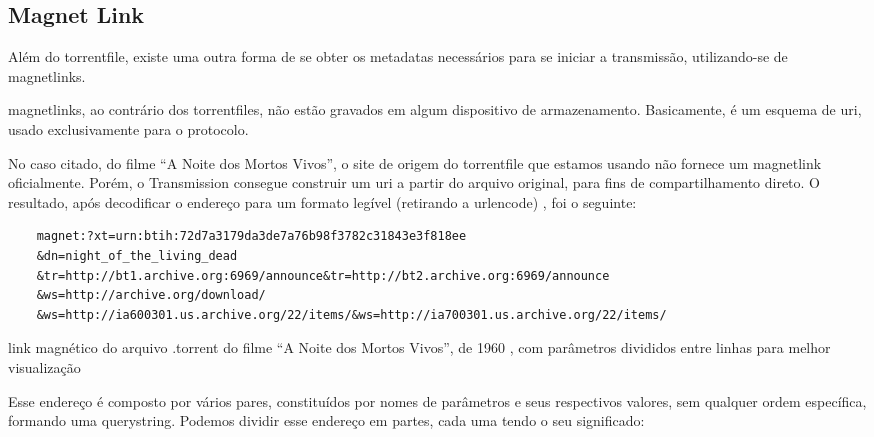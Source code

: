 
\subsection*{Magnet Link}

Além do \gls*{torrentfile}, existe uma outra forma de se obter os \glspl*{metadata}
necessários para se iniciar a transmissão, utilizando-se de \glspl{magnetlink}.

\Glspl*{magnetlink}, ao contrário dos \glspl*{torrentfile}, não estão gravados em
algum dispositivo de armazenamento. Basicamente, é um esquema de \gls{uri}, usado
exclusivamente para o protocolo.

No caso citado, do filme \enquote{A Noite dos Mortos Vivos}, o site de origem do
\gls*{torrentfile} que estamos usando não fornece um \gls*{magnetlink} oficialmente.
Porém, o Transmission consegue construir um \gls*{uri} a partir do arquivo original,
para fins de compartilhamento direto. O resultado, após decodificar o endereço para um
formato legível (retirando a \gls{urlencode}) \cite{wiki:urlencode}, foi o seguinte:

\begin{listing}[ht!]
    \begin{verbatim}
    magnet:?xt=urn:btih:72d7a3179da3de7a76b98f3782c31843e3f818ee
    &dn=night_of_the_living_dead
    &tr=http://bt1.archive.org:6969/announce&tr=http://bt2.archive.org:6969/announce
    &ws=http://archive.org/download/
    &ws=http://ia600301.us.archive.org/22/items/&ws=http://ia700301.us.archive.org/22/items/
    \end{verbatim}
    \caption{link magnético do arquivo .torrent do filme
    \enquote{A Noite dos Mortos Vivos}, de 1960 \cite{torrent-file}, com parâmetros
    divididos entre linhas para melhor visualização}
    \label{lst:torrent-file-magnet-link}
\end{listing}

Esse endereço é composto por vários pares, constituídos por nomes de parâmetros e seus
respectivos valores, sem qualquer ordem específica, formando uma \gls{querystring}.
Podemos dividir esse endereço em partes, cada uma tendo o seu significado:

